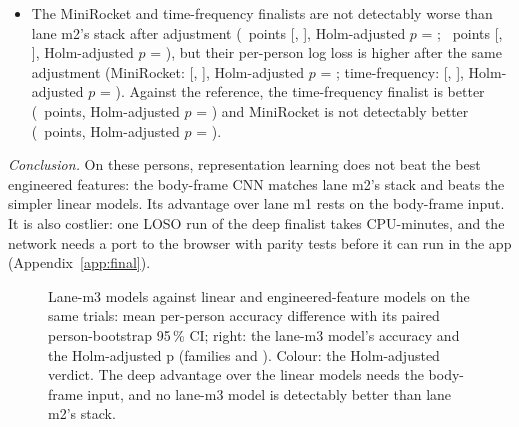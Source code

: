 \begin{itemize}
  \item The MiniRocket and time-frequency finalists are not detectably worse than lane m2's stack after adjustment (~points [, ], Holm-adjusted $p$ = ; ~points [, ], Holm-adjusted $p$ = ), but their per-person log loss is higher after the same adjustment (MiniRocket:  [, ], Holm-adjusted $p$ = ; time-frequency:  [, ], Holm-adjusted $p$ = ). Against the reference, the time-frequency finalist is better (~points, Holm-adjusted $p$ = ) and MiniRocket is not detectably better (~points, Holm-adjusted $p$ = ).
\end{itemize}

\emph{Conclusion.} On these persons, representation learning does not beat the best engineered features: the body-frame CNN matches lane m2's stack and beats the simpler linear models.
Its advantage over lane m1 rests on the body-frame input.
It is also costlier: one LOSO run of the deep finalist takes  CPU-minutes, and the network needs a port to the browser with parity tests before it can run in the app (Appendix~\ref{app:final}).

\begin{figure}[tbp]
  \centering
  \caption{Lane-m3 models against linear and engineered-feature models on the same trials: mean per-person accuracy difference with its paired person-bootstrap 95\,\% CI; right: the lane-m3 model's accuracy and the Holm-adjusted p (families  and ). Colour: the Holm-adjusted verdict. The deep advantage over the linear models needs the body-frame input, and no lane-m3 model is detectably better than lane m2's stack.}
  \label{fig:M3_10_vs_engineered}\label{fig:app:m3-engineered}
\end{figure}


